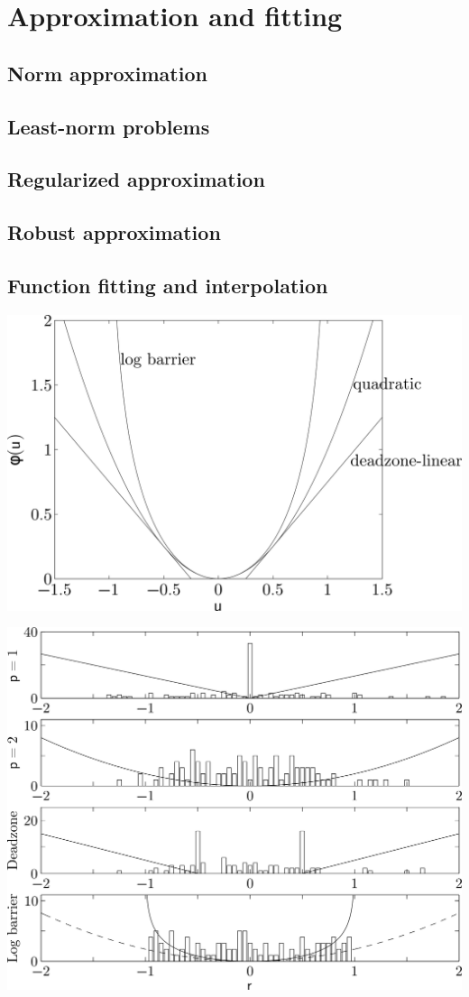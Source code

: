 \chapter{Approximation and fitting}

\clearpage
\section{Norm approximation}

\clearpage
\section{Least-norm problems}

\clearpage
\section{Regularized approximation}

\clearpage
\section{Robust approximation}

\clearpage
\section{Function fitting and interpolation}


\clearpage
\hfil\includegraphics[width=.5\textwidth]{../Graphics/295.png}\hfil

\clearpage
\hfil\includegraphics[width=.5\textwidth]{../Graphics/297.png}\hfil

